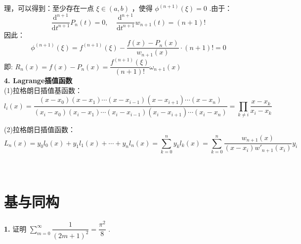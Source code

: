 \documentclass[11pt,a4paper,openany,oneside]{book}
\begin{document}
\hspace{2.7em} 理，可以得到：至少存在一点 $ \xi \in (a,b) $ ，使得 $ \phi^{(n+1)}(\xi)=0 $ .由于：
 $$  \dfrac{\mathrm{d}^{n+1}}{\mathrm{d}t^{n+1}}P_n(t) = 0,\ \ \ \ \ \dfrac{\mathrm{d}^{n+1}}{\mathrm{d}t^{n+1}}w_{n+1}(t) = (n+1)!   $$ 
\hspace{2.7em} 因此：
 $$  \phi^{(n+1)}(\xi) = f^{(n+1)}(\xi) - \dfrac{f(x) - P_n(x)}{w_{n+1}(x)}\cdot(n+1)! = 0  $$ 
\hspace{2.7em} 即: $ R_n(x) = f(x) - P_n(x) =\dfrac{f^{(n+1)}(\xi)}{(n+1)!}\omega_{n+1}(x)  $  \\

\textbf{4. Lagrange插值函数} \\
(1)拉格朗日插值基函数：
 $$ l_i(x) = \dfrac{(x-x_0)(x-x_1)\cdots(x-x_{i-1})(x-x_{i+1})\cdots(x-x_n)}{(x_i-x_0)(x_i-x_1)\cdots(x_i-x_{i-1})(x_i-x_{i+1})\cdots(x_i-x_n)} = \prod\limits_{k\neq i} \dfrac{x-x_k}{x_i-x_k} $$ 

(2)拉格朗日插值函数：
 $$  L_n(x) = y_0l_0(x) + y_1l_1(x) + \cdots + y_nl_n(x) = \sum\limits_{k=0}^n y_kl_k(x) = \sum\limits_{k=0}^n\dfrac{w_{n+1}(x)}{(x-x_i)w'_{n+1}(x_i)}y_i  $$  \\  \\  

\section{基与同构}
\begin{myexample}
	\textbf{1.} 
	证明  $ \sum\limits_{m=0}^{\infty}\dfrac{1}{(2m+1)^2}=\dfrac{\pi^2}{8} $ .
\end{myexample}
\end{document}
